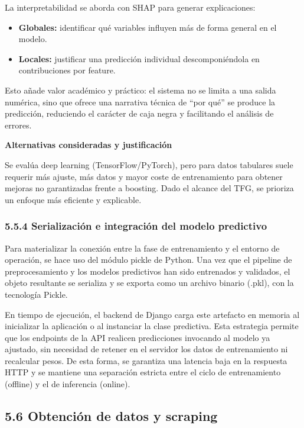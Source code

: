 La interpretabilidad se aborda con SHAP para generar explicaciones:

\begin{itemize}
\item \textbf{Globales:} identificar qué variables influyen más de forma general en el modelo.
\item \textbf{Locales:} justificar una predicción individual descomponiéndola en contribuciones por 
feature.
\end{itemize}

Esto añade valor académico y práctico: el sistema no se limita a una salida numérica, sino que ofrece 
una narrativa técnica de ``por qué'' se produce la predicción, reduciendo el carácter de caja negra y 
facilitando el análisis de errores.

\textbf{Alternativas consideradas y justificación}

Se evalúa deep learning (TensorFlow/PyTorch), pero para datos tabulares suele 
requerir más ajuste, más datos y mayor coste de entrenamiento para obtener mejoras 
no garantizadas frente a boosting. Dado el alcance del TFG, se prioriza un enfoque 
más eficiente y explicable.

\subsubsection{5.5.4 Serialización e integración del modelo predictivo}

Para materializar la conexión entre la fase de entrenamiento y el entorno de 
operación, se hace uso del módulo pickle de Python. Una vez que el pipeline de 
preprocesamiento y los modelos predictivos han sido entrenados y validados, el 
objeto resultante se serializa y se exporta como un archivo binario (.pkl), con la tecnología Pickle.

En tiempo de ejecución, el backend de Django carga este artefacto en memoria al 
inicializar la aplicación o al instanciar la clase predictiva. Esta estrategia 
permite que los endpoints de la API realicen predicciones invocando al modelo ya 
ajustado, sin necesidad de retener en el servidor los datos de entrenamiento ni 
recalcular pesos. De esta forma, se garantiza una latencia baja en la respuesta 
HTTP y se mantiene una separación estricta entre el ciclo de entrenamiento 
(offline) y el de inferencia (online).

\subsection{5.6 Obtención de datos y scraping}

